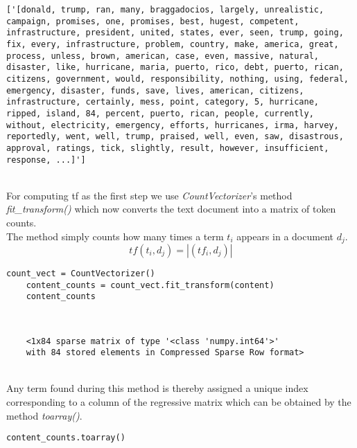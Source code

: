 \documentclass[a4paper, 11pt,titlepage,oneside,openany]{book}
\begin{document}
\begin{minipage}{\linewidth}
\begin{lstlisting}
['[donald, trump, ran, many, braggadocios, largely, unrealistic, campaign, promises, one, promises, best, hugest, competent, infrastructure, president, united, states, ever, seen, trump, going, fix, every, infrastructure, problem, country, make, america, great, process, unless, brown, american, case, even, massive, natural, disaster, like, hurricane, maria, puerto, rico, debt, puerto, rican, citizens, government, would, responsibility, nothing, using, federal, emergency, disaster, funds, save, lives, american, citizens, infrastructure, certainly, mess, point, category, 5, hurricane, ripped, island, 84, percent, puerto, rican, people, currently, without, electricity, emergency, efforts, hurricanes, irma, harvey, reportedly, went, well, trump, praised, well, even, saw, disastrous, approval, ratings, tick, slightly, result, however, insufficient, response, ...]']
\end{lstlisting}
\end{minipage} \\
\noindent For computing \gls{tf} as the first step we use \textit{CountVectorizer}'s method \textit{fit\_transform()} which now converts the text document into a matrix of token counts. \\
The method simply counts how many times a term $t_i$ appears in a document $d_j$. 
\[
	tf(t_i,d_j)= |(tf_i, d_j)|
\]
\noindent
\begin{minipage}{\linewidth}
	\begin{lstlisting}[frame=single]
	count_vect = CountVectorizer()
	content_counts = count_vect.fit_transform(content)
	content_counts
	\end{lstlisting}
\end{minipage} \\
\begin{minipage}{\linewidth}
	\begin{lstlisting}
	<1x84 sparse matrix of type '<class 'numpy.int64'>'
	with 84 stored elements in Compressed Sparse Row format>
	\end{lstlisting}
\end{minipage} \\
\noindent Any term found during this method is thereby assigned a unique index corresponding to a column of the regressive matrix which can be obtained by the method \textit{toarray()}. \\
\noindent
\begin{minipage}{\linewidth}
	\begin{lstlisting}[frame=single]
	content_counts.toarray()
	\end{lstlisting}
\end{minipage} \\
\end{document}
